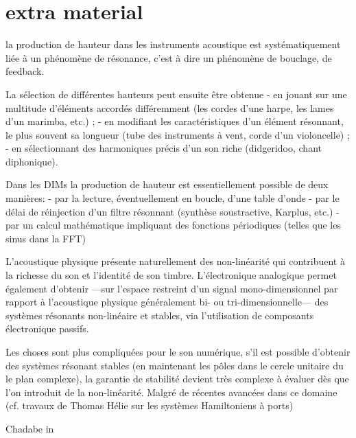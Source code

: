 \section*{extra material}

la production de hauteur dans les instruments acoustique est systématiquement liée à un phénomène de résonance, c'est à dire un phénomène de bouclage, de feedback. 

La sélection de différentes hauteurs peut ensuite être obtenue 
- en jouant sur une multitude d'éléments accordés différemment (les cordes d'une harpe, les lames
d'un marimba, etc.) ;
- en modifiant les caractéristiques d'un élément résonnant, le plus souvent sa longueur (tube des
instruments à vent, corde d'un violoncelle) ;
- en sélectionnant des harmoniques précis d'un son riche (didgeridoo, chant diphonique).


Dans les DIMs la production de hauteur est essentiellement possible de deux manières: 
- par la lecture, éventuellement en boucle, d'une table d'onde
- par le délai de réinjection d'un filtre résonnant (synthèse soustractive, Karplus, etc.)
- par un calcul mathématique impliquant des fonctions périodiques (telles que les sinus dans la FFT)

L'acoustique physique présente naturellement des non-linéarité qui contribuent à la richesse du son et l'identité de son timbre. L'électronique analogique permet également d'obtenir —sur l'espace restreint d'un signal mono-dimensionnel par rapport à l'acoustique physique généralement bi- ou tri-dimensionnelle— des systèmes résonants non-linéaire et stables, via l'utilisation de composants électronique passifs.

Les choses sont plus compliquées pour le son numérique, s'il est possible d'obtenir des systèmes résonant stables (en maintenant les pôles dans le cercle unitaire du le plan complexe), la garantie de stabilité devient très complexe à évaluer dès que l'on introduit de la non-linéarité.
Malgré de récentes avancées dans ce domaine (cf. travaux de Thomas Hélie sur les systèmes Hamiltoniens à ports)


 Chadabe in \cite{chadabe_limitations_2002}